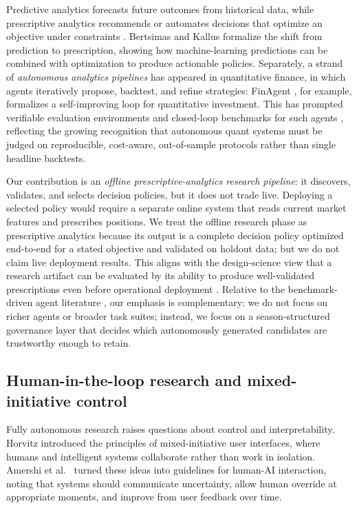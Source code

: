 \documentclass[11pt,a4paper]{article}
\begin{document}
Predictive analytics forecasts future outcomes from historical data, while prescriptive analytics recommends or automates decisions that optimize an objective under constraints \citep{davenport_2007, shmueli_2011}. Bertsimas and Kallus \citep{bertsimas_2020} formalize the shift from prediction to prescription, showing how machine-learning predictions can be combined with optimization to produce actionable policies. Separately, a strand of \emph{autonomous analytics pipelines} has appeared in quantitative finance, in which agents iteratively propose, backtest, and refine strategies: FinAgent \citep{zhang_2024_finagent}, for example, formalizes a self-improving loop for quantitative investment. This has prompted verifiable evaluation environments and closed-loop benchmarks for such agents \citep{sun_2023_trademaster, sun_2023_prudex_compass}, reflecting the growing recognition that autonomous quant systems must be judged on reproducible, cost-aware, out-of-sample protocols rather than single headline backtests.

Our contribution is an \emph{offline prescriptive-analytics research pipeline}: it discovers, validates, and selects decision policies, but it does not trade live. Deploying a selected policy would require a separate online system that reads current market features and prescribes positions. We treat the offline research phase as prescriptive analytics because its output is a complete decision policy optimized end-to-end for a stated objective and validated on holdout data; but we do not claim live deployment results. This aligns with the design-science view that a research artifact can be evaluated by its ability to produce well-validated prescriptions even before operational deployment \citep{hevner_2004}. Relative to the benchmark-driven agent literature \citep{sun_2023_trademaster, sun_2023_prudex_compass}, our emphasis is complementary: we do not focus on richer agents or broader task suites; instead, we focus on a season-structured governance layer that decides which autonomously generated candidates are trustworthy enough to retain.

\subsection{Human-in-the-loop research and mixed-initiative control}\label{human-in-the-loop-research-and-mixed-initiative-control}

Fully autonomous research raises questions about control and interpretability. Horvitz \citep{horvitz_1999} introduced the principles of mixed-initiative user interfaces, where humans and intelligent systems collaborate rather than work in isolation. Amershi et al.~\citep{amershi_2019} turned these ideas into guidelines for human-AI interaction, noting that systems should communicate uncertainty, allow human override at appropriate moments, and improve from user feedback over time.
\end{document}
